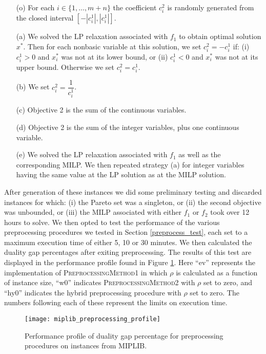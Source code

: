 \documentclass[11.5pt]{article}
\begin{document}
\begin{enumerate}
\item[(o)] For each $i\in \{1,\dots,m+n\}$ the coefficient $c^2_i$ is randomly generated from the closed interval $\left[-|c^1_i|,|c^1_i|\right]$.
\item[(a)] We solved the LP relaxation associated with $f_1$ to obtain optimal solution $x^*$. Then for each nonbasic variable at this solution, we set $c^2_i = - c_i^1$ if: (i) $c^1_i >0$ and $x^*_i$ was not at its lower bound, or (ii) $c^1_i <0$ and $x^*_i$ was not at its upper bound. Otherwise we set $c^2_i = c_i^1$.
\item[(b)] We set $c^2_i = \dfrac{1}{c^1_i}$.
\item[(c)] Objective 2 is the sum of the continuous variables.
\item[(d)] Objective 2 is the sum of the integer variables, plus one continuous variable.
\item[(e)] We solved the LP relaxation associated with $f_1$ as well as the corresponding MILP. We then repeated strategy (a) for integer variables having the same value at the LP solution as at the MILP solution.
\end{enumerate}

After generation of these instances we did some preliminary testing and discarded instances for which: (i) the Pareto set was a singleton, or (ii) the second objective was unbounded, or (iii) the MILP associated with either $f_1$ or $f_2$ took over 12 hours to solve. We then opted to test the performance of the various preprocessing procedures we tested in Section \ref{preprocess_test}, each set to a maximum execution time of either 5, 10 or 30 minutes. We then calculated the duality gap percentages after exiting preprocessing. The results of this test are displayed in the performance profile found in Figure \ref{prof}. Here ``ev'' represents the implementation of \textsc{PreprocessingMethod1} in which $\rho$ is calculated as a function of instance size, ``w0'' indicates \textsc{PreprocessingMethod2} with $\rho$ set to zero, and ``hy0'' indicates the hybrid preprocessing procedure with $\rho$ set to zero. The numbers following each of these represent the limits on execution time. 

\begin{figure}%
\centering
\texttt{[image: miplib\_preprocessing\_profile]}
\caption{Performance profile of duality gap percentage for preprocessing procedures on instances from MIPLIB.}
\label{prof}
\end{figure}
\end{document}
